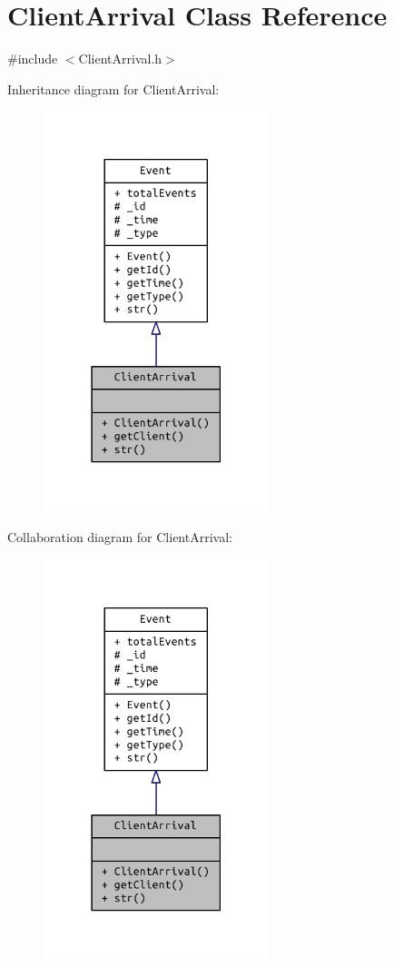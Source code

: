 \hypertarget{class_client_arrival}{}\section{Client\+Arrival Class Reference}
\label{class_client_arrival}


{\ttfamily \#include $<$Client\+Arrival.\+h$>$}



Inheritance diagram for Client\+Arrival\+:
\nopagebreak
\begin{figure}[H]
\begin{center}
\leavevmode
\includegraphics[width=186pt]{class_client_arrival__inherit__graph}
\end{center}
\end{figure}


Collaboration diagram for Client\+Arrival\+:
\nopagebreak
\begin{figure}[H]
\begin{center}
\leavevmode
\includegraphics[width=186pt]{class_client_arrival__coll__graph}
\end{center}
\end{figure}
